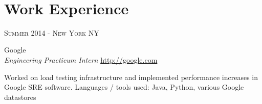 \documentclass[10pt]{article} %
\begin{document}
\color{text1} %


\par{\\ %
	

\begin{minipage}[t]{0.5\textwidth} %
\vspace{0pt} %



\section{Work Experience} 


{\raggedleft\textsc{Summer 2014 - New York NY}\par}

{\raggedright\large Google \\
\textit{Engineering Practicum Intern}  \hfill {\small \href{http://google.com}{http://google.com}}\\ [5pt]}

\normalsize{Worked on load testing infrastructure and implemented performance increases
    in Google SRE software. Languages / tools used: Java, Python, various Google datastores}\\



\end{minipage}}
\end{document}

